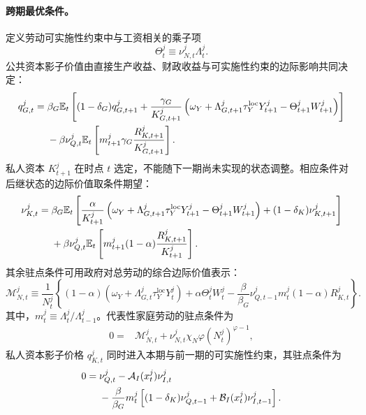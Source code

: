 \documentclass[12pt,UTF8]{ctexart}
\newcommand{\E}{\mathbb{E}}
\begin{document}
	\paragraph{跨期最优条件。}
	定义劳动可实施性约束中与工资相关的乘子项
	\begin{equation}
		\Theta_t^j\equiv
		\nu_{N,t}^j\Lambda_{t}^j.
		\label{eq:stackelberg_auxiliary}
	\end{equation}
	公共资本影子价值由直接生产收益、财政收益与可实施性约束的边际影响共同决定：
	\begin{align}
		q_{G,t}^j
		={}&\beta_G \E_t\left[
		(1-\delta_G)q_{G,t+1}^j
		+\frac{\gamma_G}{K_{G,t+1}^j}
		\left(
		\omega_Y+\Lambda_{G,t+1}^j\tau_Y^{\mathrm{loc}} Y_{t+1}^j
		-\Theta_{t+1}^jW_{t+1}^j
		\right)
		\right] \notag\\
		&-\beta\nu_{Q,t}^j \E_t\left[
		m_{t+1}^j\gamma_G\frac{R_{K,t+1}^j}{K_{G,t+1}^j}
		\right].
		\label{eq:stackelberg_QG}
	\end{align}
	私人资本 $K_{t+1}^j$ 在时点 $t$ 选定，不能随下一期尚未实现的状态调整。相应条件对后继状态的边际价值取条件期望：
	\begin{align}
		\nu_{K,t}^j
		={}&\beta_G \E_t\left[
		\frac{\alpha}{K_{t+1}^j}
		\left(
		\omega_Y+\Lambda_{G,t+1}^j\tau_Y^{\mathrm{loc}} Y_{t+1}^j
		-\Theta_{t+1}^jW_{t+1}^j
		\right)
		+(1-\delta_K)\nu_{K,t+1}^j
		\right] \notag\\
		&+\beta\nu_{Q,t}^j \E_t\left[
		m_{t+1}^j(1-\alpha)
		\frac{R_{K,t+1}^j}{K_{t+1}^j}
		\right].
		\label{eq:stackelberg_K_corrected}
	\end{align}
	其余驻点条件可用政府对总劳动的综合边际价值表示：
	\begin{equation}
		\mathcal M_{N,t}^j
		\equiv\frac{1}{N_t^j}\left\{
		(1-\alpha)\left(\omega_Y+\Lambda_{G,t}^j\tau_Y^{\mathrm{loc}} Y_t^j\right)
		+\alpha\Theta_t^jW_t^j
		-\frac{\beta}{\beta_G}\nu_{Q,t-1}^jm_t^j(1-\alpha)R_{K,t}^j
		\right\}.
		\label{eq:stackelberg_labor_margin}
	\end{equation}
	其中，$m_t^j\equiv\Lambda_{t}^j/\Lambda_{t-1}^j$。代表性家庭劳动的驻点条件为
	\begin{align}
		0={}&\mathcal M_{N,t}^j
		+\nu_{N,t}^j\chi_N\varphi(N_{t}^j)^{\varphi-1},
		\label{eq:stackelberg_NR}
	\end{align}
	私人资本影子价格 $q_{K,t}^j$ 同时进入本期与前一期的可实施性约束，其驻点条件为
	\begin{align}
		0={}&\nu_{Q,t}^j-\mathcal A_I(x_t^j)\nu_{I,t}^j \notag\\
		&-\frac{\beta}{\beta_G}m_t^j\left[
		(1-\delta_K)\nu_{Q,t-1}^j
		+\mathcal B_I(x_t^j)\nu_{I,t-1}^j
		\right].
		\label{eq:stackelberg_QK}
	\end{align}
\end{document}
